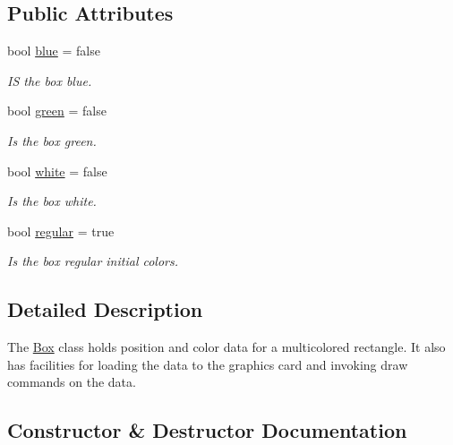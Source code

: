 \subsection*{Public Attributes}
\begin{DoxyCompactItemize}
\item 
\mbox{\label{class_box_adf8471c9458d66bf70133ea82fc3e573}} 
bool \hyperlink{class_box_adf8471c9458d66bf70133ea82fc3e573}{blue} = false
\begin{DoxyCompactList}\small\item\em IS the box blue. \end{DoxyCompactList}\item 
\mbox{\label{class_box_a56e505754cda98f6d9dce9ec1b9e1784}} 
bool \hyperlink{class_box_a56e505754cda98f6d9dce9ec1b9e1784}{green} = false
\begin{DoxyCompactList}\small\item\em Is the box green. \end{DoxyCompactList}\item 
\mbox{\label{class_box_a3393c92d8028e14f3e28d0425ec44d2d}} 
bool \hyperlink{class_box_a3393c92d8028e14f3e28d0425ec44d2d}{white} = false
\begin{DoxyCompactList}\small\item\em Is the box white. \end{DoxyCompactList}\item 
\mbox{\label{class_box_abe969fa54b988288fea44bd1d4b18df5}} 
bool \hyperlink{class_box_abe969fa54b988288fea44bd1d4b18df5}{regular} = true
\begin{DoxyCompactList}\small\item\em Is the box regular initial colors. \end{DoxyCompactList}\end{DoxyCompactItemize}


\subsection{Detailed Description}
The \hyperlink{class_box}{Box} class holds position and color data for a multicolored rectangle. It also has facilities for loading the data to the graphics card and invoking draw commands on the data. 

\subsection{Constructor \& Destructor Documentation}
\mbox{\label{class_box_a60ab766bbad3c0e5abe69b50cb3fe6ed}} 
